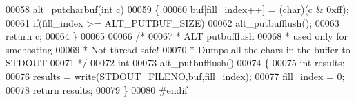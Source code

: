 \begin{DoxyCode}
00058 alt\_putcharbuf(\textcolor{keywordtype}{int} c)
00059 \{
00060     buf[fill\_index++] = (char)(c & 0xff);
00061     \textcolor{keywordflow}{if}(fill\_index >= ALT\_PUTBUF\_SIZE)
00062         alt\_putbufflush();
00063     \textcolor{keywordflow}{return} c;
00064 \}
00065 
00066 \textcolor{comment}{/*}
00067 \textcolor{comment}{ * ALT putbufflush }
00068 \textcolor{comment}{ * used only for smehosting}
00069 \textcolor{comment}{ * Not thread safe!}
00070 \textcolor{comment}{ * Dumps all the chars in the buffer to STDOUT}
00071 \textcolor{comment}{ */}
00072 \textcolor{keywordtype}{int} 
00073 alt\_putbufflush()
00074 \{
00075     \textcolor{keywordtype}{int} results;
00076     results = write(STDOUT\_FILENO,buf,fill\_index);
00077     fill\_index = 0;
00078     \textcolor{keywordflow}{return} results;
00079 \}
00080 \textcolor{preprocessor}{#endif}
\end{DoxyCode}
